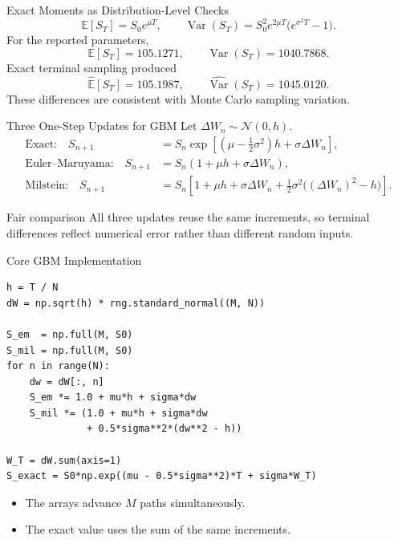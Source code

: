 \documentclass[aspectratio=169,10pt]{beamer}
\newcommand{\E}{\mathbb{E}}
\newcommand{\Var}{\operatorname{Var}}
\newcommand{\Normal}{\mathcal{N}}
\begin{document}
\begin{frame}{Exact Moments as Distribution-Level Checks}
  \[
    \E[S_T]=S_0e^{\mu T},\qquad
    \Var(S_T)=S_0^2e^{2\mu T}\bigl(e^{\sigma^2T}-1\bigr).
  \]
  For the reported parameters,
  \[
    \E[S_T]=105.1271,\qquad \Var(S_T)=1040.7868.
  \]
  Exact terminal sampling produced
  \[
    \widehat{\E}[S_T]=105.1987,\qquad
    \widehat{\Var}(S_T)=1045.0120.
  \]
  These differences are consistent with Monte Carlo sampling variation.
\end{frame}

\begin{frame}{Three One-Step Updates for GBM}
  Let $\Delta W_n\sim\Normal(0,h)$.
  \begin{align*}
    \text{Exact:}\quad
    S_{n+1}&=S_n\exp\!\left[
      \left(\mu-\tfrac12\sigma^2\right)h+\sigma\Delta W_n\right],\\
    \text{Euler--Maruyama:}\quad
    S_{n+1}&=S_n\left(1+\mu h+\sigma\Delta W_n\right),\\
    \text{Milstein:}\quad
    S_{n+1}&=S_n\left[1+\mu h+\sigma\Delta W_n
      +\tfrac12\sigma^2\bigl((\Delta W_n)^2-h\bigr)\right].
  \end{align*}
  \begin{block}{Fair comparison}
    All three updates reuse the same increments, so terminal differences
    reflect numerical error rather than different random inputs.
  \end{block}
\end{frame}

\begin{frame}[fragile]{Core GBM Implementation}
\begin{lstlisting}
h = T / N
dW = np.sqrt(h) * rng.standard_normal((M, N))

S_em  = np.full(M, S0)
S_mil = np.full(M, S0)
for n in range(N):
    dw = dW[:, n]
    S_em *= 1.0 + mu*h + sigma*dw
    S_mil *= (1.0 + mu*h + sigma*dw
              + 0.5*sigma**2*(dw**2 - h))

W_T = dW.sum(axis=1)
S_exact = S0*np.exp((mu - 0.5*sigma**2)*T + sigma*W_T)
\end{lstlisting}
  \vspace{-0.4em}
  \begin{itemize}
    \item The arrays advance $M$ paths simultaneously.
    \item The exact value uses the sum of the same increments.
  \end{itemize}
\end{frame}
\end{document}

